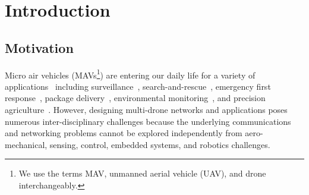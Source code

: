 \chapter{Introduction}\label{chap:intro}

\section{Motivation}\label{sec:ch1:intro}
Micro air vehicles (MAVs\footnote{We use the terms MAV, unmanned aerial vehicle (UAV), and drone interchangeably.}) are entering our daily life for a variety of applications~\cite{morgenthaler2012uavnet} including surveillance~\cite{valavanis2014handbook, haggerty2011surveillance, finn2012unmanned}, search-and-rescue~\cite{modares-icra17, luo2011multi, bertram2008unmanned, floreano2015science, bozkurt2014toward}, emergency first response~\cite{purohit2011sensorfly}, package delivery~\cite{murray2015flying, murray2013incorporating, mathew2015planning, d2014guest}, environmental monitoring~\cite{ball2017swarm, quaritsch2010networked, rossi2014gas}, and precision agriculture~\cite{das2015devices, valente2013aerial, tang2015drone, cambra2014deployment, pederi2015unmanned, tripicchio2015towards, duggal2016plantation, faiccal2014use}.
However, designing multi-drone networks and applications poses numerous inter-disciplinary challenges because the underlying communications and networking problems cannot be explored independently from aero-mechanical, sensing, control, embedded systems, and robotics challenges.

